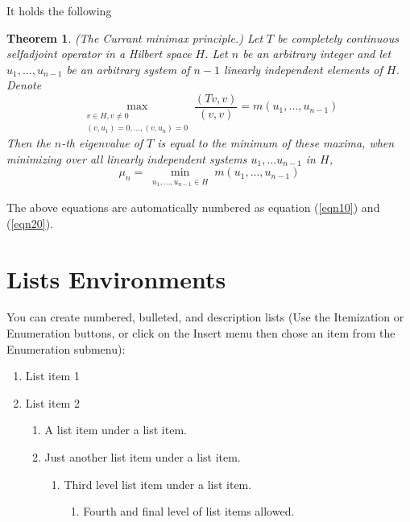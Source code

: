 \documentclass{report}%
\newtheorem{theorem}{Theorem}
\begin{document}
It holds \cite{KarelRektorys} the following
\begin{theorem}
(The Currant minimax principle.) Let $T$ be completely continuous
selfadjoint operator in a Hilbert space $H$. Let $n$ be an
arbitrary integer and let $u_1,\ldots,u_{n-1}$ be an arbitrary
system of $n-1$ linearly independent elements of $H$. Denote
\begin{equation}
\max_{\substack{v\in H, v\neq
0\\(v,u_1)=0,\ldots,(v,u_n)=0}}\frac{(Tv,v)}{(v,v)}=m(u_1,\ldots,
u_{n-1}) \label{eqn10}
\end{equation}
Then the $n$-th eigenvalue of $T$ is equal to the minimum of these
maxima, when minimizing over all linearly independent systems
$u_1,\ldots u_{n-1}$ in $H$,
\begin{equation}
\mu_n = \min_{\substack{u_1,\ldots, u_{n-1}\in H}} m(u_1,\ldots,
u_{n-1}) \label{eqn20}
\end{equation}
\end{theorem}
The above equations are automatically numbered as equation
(\ref{eqn10}) and (\ref{eqn20}).

\section{Lists Environments}

You can create numbered, bulleted, and description lists (Use the
Itemization or Enumeration buttons, or click on the Insert menu
then chose an item from the Enumeration submenu):

\begin{enumerate}
\item List item 1

\item List item 2

\begin{enumerate}
\item A list item under a list item.

\item Just another list item under a list item.

\begin{enumerate}
\item Third level list item under a list item.

\begin{enumerate}
\item Fourth and final level of list items allowed.
\end{enumerate}
\end{enumerate}
\end{enumerate}
\end{enumerate}
\end{document}
